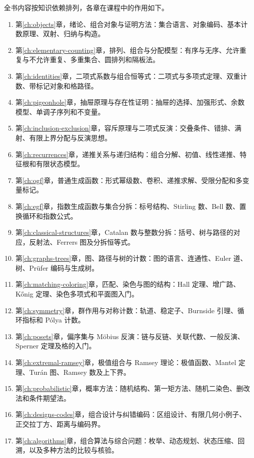 \documentclass[UTF8,12pt,a4paper,fontset=fandol]{ctexbook}
\begin{document}
全书内容按知识依赖排列，各章在课程中的作用如下。
\begin{enumerate}
  \item 第\ref{ch:objects}章，绪论、组合对象与证明方法：集合语言、对象编码、基本计数原理、双射、归纳与构造。
  \item 第\ref{ch:elementary-counting}章，排列、组合与分配模型：有序与无序、允许重复与不允许重复、多重集合、圆排列和隔板法。
  \item 第\ref{ch:identities}章，二项式系数与组合恒等式：二项式与多项式定理、双重计数、带标记对象和格路径。
  \item 第\ref{ch:pigeonhole}章，抽屉原理与存在性证明：抽屉的选择、加强形式、余数模型、单调子序列和不变量。
  \item 第\ref{ch:inclusion-exclusion}章，容斥原理与二项式反演：交叠条件、错排、满射、有限上界分配与反演思想。
  \item 第\ref{ch:recurrences}章，递推关系与递归结构：组合分解、初值、线性递推、特征根和有限状态模型。
  \item 第\ref{ch:ogf}章，普通生成函数：形式幂级数、卷积、递推求解、受限分配和多变量标记。
  \item 第\ref{ch:egf}章，指数生成函数与集合分拆：标号结构、Stirling 数、Bell 数、置换循环和指数公式。
  \item 第\ref{ch:classical-structures}章，Catalan 数与整数分拆：括号、树与路径的对应，反射法、Ferrers 图及分拆恒等式。
  \item 第\ref{ch:graphs-trees}章，图、路径与树的计数：图的语言、连通性、Euler 道、树、Pr\"ufer 编码与生成树。
  \item 第\ref{ch:matching-coloring}章，匹配、染色与图的结构：Hall 定理、增广路、K\H{o}nig 定理、染色多项式和平面图入门。
  \item 第\ref{ch:symmetry}章，群作用与对称计数：轨道、稳定子、Burnside 引理、循环指标和 P\'olya 计数。
  \item 第\ref{ch:posets}章，偏序集与 M\"obius 反演：链与反链、关联代数、一般反演、Sperner 定理及格的入门。
  \item 第\ref{ch:extremal-ramsey}章，极值组合与 Ramsey 理论：极值函数、Mantel 定理、Tur\'an 图、Ramsey 数及上下界。
  \item 第\ref{ch:probabilistic}章，概率方法：随机结构、第一矩方法、随机二染色、删改法和条件期望法。
  \item 第\ref{ch:designs-codes}章，组合设计与纠错编码：区组设计、有限几何小例子、正交拉丁方、距离与编码界。
  \item 第\ref{ch:algorithms}章，组合算法与综合问题：枚举、动态规划、状态压缩、回溯，以及多种方法的比较与核验。
\end{enumerate}
\end{document}
